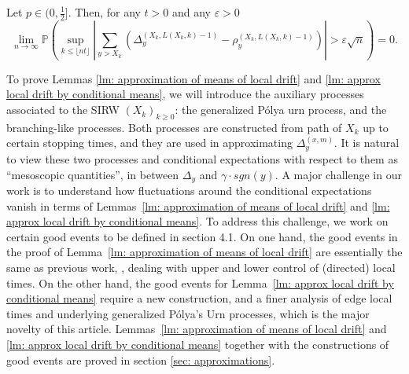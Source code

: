 \documentclass[EJP]{ejpecp} %
\newcommand{\abs}[1]{\left\vert #1 \right\vert}
\begin{document}
\begin{lemma}\label{lm: approx local drift by conditional means}
	Let $p\in (0,\frac{1}{2}]$. Then, for any $t>0$ and any $\varepsilon >0$
	\begin{equation}
		\lim_{n \to \infty }\mathbb{P}\left(\sup_{k\leq\lfloor nt \rfloor} \abs{\sum_{y> X_k} \left(\Delta_{y}^{(X_k,L(X_k,k)-1)}- \rho_{y}^{(X_k,L(X_k,k)-1)} \right)   }  > \varepsilon \sqrt{n}  \right) =0. 
	\end{equation}
\end{lemma}



To prove Lemmas \ref{lm: approximation of means of local drift} and \ref{lm: approx local drift by conditional means}, we will introduce the auxiliary processes associated to the SIRW $(X_k)_{k\geq 0}$: the generalized P\'{o}lya urn process, and the branching-like processes. Both processes are constructed from path of $X_k$ up to certain stopping times, and they are used in approximating $\Delta_{y}^{(x,m)}$.
It is natural to view these two processes and conditional expectations with respect to them as ``mesoscopic quantities'', in between $\Delta_y$ and $\gamma\cdot sgn(y)$.
A major challenge in our work is to understand how fluctuations around the conditional expectations vanish in terms of Lemmas~\ref{lm: approximation of means of local drift} and \ref{lm: approx local drift by conditional means}.
To address this challenge, we work on certain good events to be defined in section 4.1.
On one hand, the good events in the proof of Lemma~\ref{lm: approximation of means of local drift} are essentially the same as previous work, \cite{KMP23}, dealing with upper and lower control of (directed) local times. 
On the other hand, the good events for Lemma~\ref{lm: approx local drift by conditional means} require a new construction, and a finer analysis of edge local times and underlying generalized P\'olya’s Urn processes, which is the major novelty of this article. 
Lemmas~\ref{lm: approximation of means of local drift} and \ref{lm: approx local drift by conditional means} together with the constructions of good events are proved in section \ref{sec: approximations}.
\end{document}
